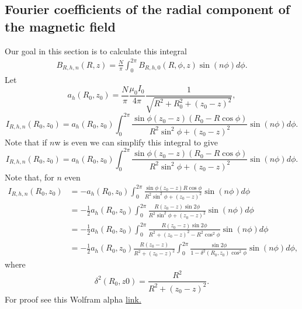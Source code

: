 \documentclass{article}
\begin{document}
\subsection{Fourier coefficients of the radial component of the magnetic field}

Our goal in this section is to calculate this integral
\[\begin{aligned}
B_{R, h, n}(R, z)= \frac{N}{\pi}\int_0^{2\pi} B_{R, h, 0}(R, \phi, z)\sin(n\phi)d\phi.
\end{aligned}\]
Let
\[a_h(R_0, z_0)=\frac{N}{\pi}\frac{\mu_0 I_0}{4\pi}\frac{1}{\sqrt{R^2+R_0^2+(z_0-z)^2}},\]
\[I_{R,h,n}(R_0, z_0) = a_h(R_0, z_0)\int_0^{2\pi}\frac{\sin\phi(z_0-z)(R_0-R\cos\phi)}{R^2\sin^2\phi+(z_0-z)^2}\sin(n\phi) d\phi.\]
Note that if $n$w is even we can simplify this integral to give
\[I_{R,h,n}(R_0, z_0) = a_h(R_0, z_0)\int_0^{2\pi}\frac{\sin\phi(z_0-z)(R_0-R\cos\phi)}{R^2\sin^2\phi+(z_0-z)^2}\sin(n\phi) d\phi.\]
Note that, for $n$ even
\[\begin{aligned}
I_{R,h,n}(R_0, z_0) &= -a_h(R_0, z_0)\int_0^{2\pi}\frac{\sin\phi(z_0-z)R\cos\phi}{R^2\sin^2\phi+(z_0-z)^2}\sin(n\phi) d\phi \\
&= -\frac{1}{2}a_h(R_0, z_0)\int_0^{2\pi}\frac{R(z_0-z)\sin2\phi}{R^2\sin^2\phi+(z_0-z)^2}\sin(n\phi) d\phi \\
&= -\frac{1}{2}a_h(R_0, z_0)\int_0^{2\pi}\frac{R(z_0-z)\sin2\phi}{R^2+(z_0-z)^2-R^2\cos^2\phi}\sin(n\phi) d\phi \\
&= -\frac{1}{2}a_h(R_0, z_0)\frac{R(z_0-z)}{R^2+(z_0-z)^2}\int_0^{2\pi}\frac{\sin2\phi}{1-\delta^2(R_0, z_0)\cos^2\phi}\sin(n\phi) d\phi,
\end{aligned}\]
where
\[\delta^2(R_0,z0) = \frac{R^2}{R^2 + (z_0-z)^2}.\]
For proof see this Wolfram alpha
\href{https://www.wolframalpha.com/input?i=residues+of+%28%28z-1%2Fz%29%2F%282i%29%29*gamma*%28pi%29+*+%28z%5E6-1%2Fz%5E6%29%2F%282i%29+%2F+%28exp%282%29*%28%28z-1%2Fz%29%2F%282i%29%29%5E2%2Bgamma*gamma%29+*+%281%2F%28I*z%29%29}{link.}
\end{document}
